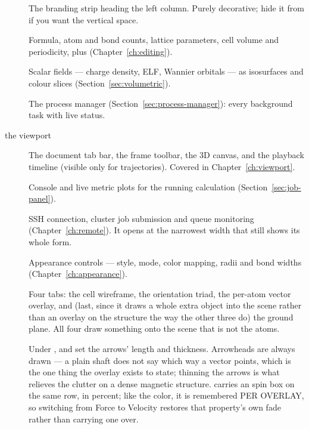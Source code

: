 \begin{description}
  \item[] The branding strip heading the left column. Purely
    decorative; hide it from  if you want the vertical space.
  \item[] Formula, atom and bond counts, lattice parameters,
    cell volume and periodicity, plus 
    (Chapter~\ref{ch:editing}).
  \item[] Scalar fields --- charge density, ELF, Wannier
    orbitals --- as isosurfaces and colour slices (Section~\ref{sec:volumetric}).
  \item[] The process manager
    (Section~\ref{sec:process-manager}): every background task with live status.
  \item[the viewport] The document tab bar, the frame toolbar, the 3D canvas,
    and the playback timeline (visible only for trajectories). Covered in
    Chapter~\ref{ch:viewport}.
  \item[] Console and live metric plots for the running
    calculation (Section~\ref{sec:job-panel}).
  \item[] SSH connection, cluster job submission and queue
    monitoring (Chapter~\ref{ch:remote}). It opens at the narrowest width that
    still shows its whole form.
  \item[] Appearance controls --- style, mode, color
    mapping, radii and bond widths (Chapter~\ref{ch:appearance}).
  \item[] Four tabs: the cell wireframe, the
    orientation triad, the per-atom vector overlay, and (last, since it draws
    a whole extra object into the scene rather than an overlay on the
    structure the way the other three do) the ground plane. All four draw
    something onto the scene that is not the atoms.

    Under ,  and  set the
    arrows' length and thickness. Arrowheads are always drawn --- a plain
    shaft does not say which way a vector points, which is the one thing the
    overlay exists to state; thinning the arrows is what relieves the clutter
    on a dense magnetic structure.  carries an
     spin box on the same row, in percent; like the color, it is
    remembered PER OVERLAY, so switching from Force to Velocity restores
    that property's own fade rather than carrying one over.


\end{description}

